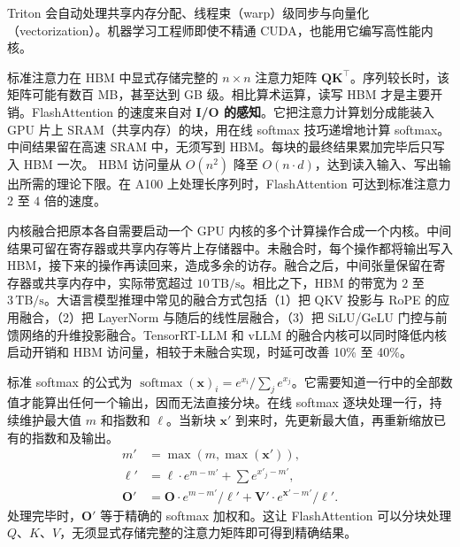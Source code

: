 Triton 会自动处理共享内存分配、线程束（warp）级同步与向量化（vectorization）。机器学习工程师即使不精通 CUDA，也能用它编写高性能内核。


\begin{interview}
标准注意力在 HBM 中显式存储完整的 \(n\times n\) 注意力矩阵 \(\mathbf{Q}\mathbf{K}^{\top}\)。序列较长时，该矩阵可能有数百 MB，甚至达到 GB 级。相比算术运算，读写 HBM 才是主要开销。FlashAttention 的速度来自对 \textbf{I/O 的感知}。它把注意力计算划分成能装入 GPU 片上 SRAM（共享内存）的块，用在线 softmax 技巧递增地计算 softmax。中间结果留在高速 SRAM 中，无须写到 HBM。每块的最终结果累加完毕后只写入 HBM 一次。
HBM 访问量从 \(O(n^2)\) 降至 \(O(n\cdot d)\)，达到读入输入、写出输出所需的理论下限。在 A100 上处理长序列时，FlashAttention 可达到标准注意力 \(2\) 至 \(4\) 倍的速度。

内核融合把原本各自需要启动一个 GPU 内核的多个计算操作合成一个内核。中间结果可留在寄存器或共享内存等片上存储器中。未融合时，每个操作都将输出写入 HBM，接下来的操作再读回来，造成多余的访存。融合之后，中间张量保留在寄存器或共享内存中，实际带宽超过 \(10\,\mathrm{TB/s}\)。相比之下，HBM 的带宽为 \(2\) 至 \(3\,\mathrm{TB/s}\)。大语言模型推理中常见的融合方式包括（1）把 QKV 投影与 RoPE 的应用融合，（2）把 LayerNorm 与随后的线性层融合，（3）把 SiLU/GeLU 门控与前馈网络的升维投影融合。TensorRT-LLM 和 vLLM 的融合内核可以同时降低内核启动开销和 HBM 访问量，相较于未融合实现，时延可改善 10\% 至 40\%。

标准 softmax 的公式为 \(\operatorname{softmax}(\mathbf{x})_i=e^{x_i}/\sum_j e^{x_j}\)。它需要知道一行中的全部数值才能算出任何一个输出，因而无法直接分块。在线 softmax 逐块处理一行，持续维护最大值 \(m\) 和指数和 \(\ell\)。当新块 \(\mathbf{x}'\) 到来时，先更新最大值，再重新缩放已有的指数和及输出。
\[
  \begin{aligned}
    m' &= \max(m,\max(\mathbf{x}')), \\
    \ell' &= \ell\cdot e^{m-m'} + \sum e^{x'_j-m'}, \\
    \mathbf{O}' &= \mathbf{O}\cdot e^{m-m'}/\ell'
       + \mathbf{V}'\cdot e^{\mathbf{x}'-m'}/\ell'.
  \end{aligned}
\]
处理完毕时，\(\mathbf{O}'\) 等于精确的 softmax 加权和。这让 FlashAttention 可以分块处理 \(Q\)、\(K\)、\(V\)，无须显式存储完整的注意力矩阵即可得到精确结果。


\end{interview}
